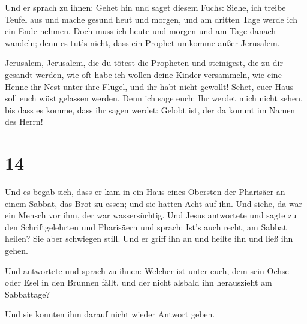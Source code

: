  Und er sprach zu ihnen: Gehet hin und saget diesem
Fuchs: Siehe, ich treibe Teufel aus und mache gesund heut und morgen,
und am dritten Tage werde ich ein Ende nehmen.  Doch muss
ich heute und morgen und am Tage danach wandeln; denn es tut's nicht,
dass ein Prophet umkomme außer Jerusalem.

 Jerusalem, Jerusalem, die du tötest die Propheten und
steinigest, die zu dir gesandt werden, wie oft habe ich wollen deine
Kinder versammeln, wie eine Henne ihr Nest unter ihre Flügel, und ihr
habt nicht gewollt!  Sehet, euer Haus soll euch wüst
gelassen werden. Denn ich sage euch: Ihr werdet mich nicht sehen, bis
dass es komme, dass ihr sagen werdet: Gelobt ist, der da kommt im Namen
des Herrn!

\hypertarget{section-13}{%
\section{14}\label{section-13}}

 Und es begab sich, dass er kam in ein Haus eines Obersten
der Pharisäer an einem Sabbat, das Brot zu essen; und sie hatten Acht
auf ihn.  Und siehe, da war ein Mensch vor ihm, der war
wassersüchtig.  Und Jesus antwortete und sagte zu den
Schriftgelehrten und Pharisäern und sprach: Ist's auch recht, am Sabbat
heilen?  Sie aber schwiegen still. Und er griff ihn an und
heilte ihn und ließ ihn gehen.

 Und antwortete und sprach zu ihnen: Welcher ist unter
euch, dem sein Ochse oder Esel in den Brunnen fällt, und der nicht
alsbald ihn herauszieht am Sabbattage?

 Und sie konnten ihm darauf nicht wieder Antwort geben.

